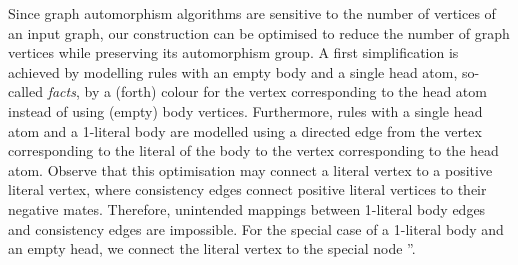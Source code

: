 \documentclass[envcountsame]{llncs}
\begin{document}
Since graph automorphism algorithms are sensitive to the number of vertices of an input graph, our construction can be optimised to reduce the number of graph vertices while preserving its automorphism group. A first simplification is achieved by modelling rules with an empty body and a single head atom, so-called \emph{facts}, by a (forth) colour for the vertex corresponding to the head atom instead of using (empty) body vertices. Furthermore, rules with a single head atom and a 1-literal body are modelled using a directed edge from the vertex corresponding to the literal of the body to the vertex corresponding to the head atom. Observe that this optimisation may connect a literal vertex to a positive literal vertex, where consistency edges connect positive literal vertices to their negative mates. Therefore, unintended mappings between 1-literal body edges and consistency edges are impossible. For the special case of a 1-literal body and an empty head, we connect the literal vertex to the special node ''.
\end{document}

